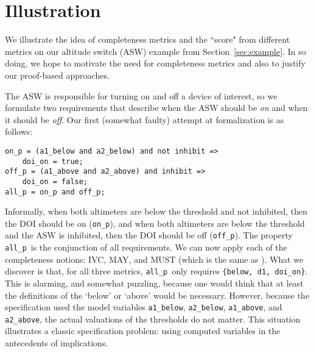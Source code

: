 \section{Illustration}
\label{sec:illust}

\newcommand{\allp}{\texttt{all\_p}}
\newcommand{\onp}{\texttt{on\_p}}
\newcommand{\offp}{\texttt{off\_p}}
\newcommand{\hystp}{\texttt{hyst\_p}}
\newcommand{\aonebelow}{\texttt{a1\_below}}
\newcommand{\atwobelow}{\texttt{a2\_below}}
\newcommand{\aoneabove}{\texttt{a1\_above}}
\newcommand{\atwoabove}{\texttt{a2\_above}}
\newcommand{\doion}{\texttt{doi\_on}}
\newcommand{\done}{\texttt{d1}}
\newcommand{\dtwo}{\texttt{d2}}
\newcommand{\abovehyst}{\texttt{above\_hyst}}
\newcommand{\inhibit}{\texttt{inhibit}}

We illustrate the idea of completeness metrics and the ``score" from different metrics on our altitude switch (ASW) example from Section~\ref{sec:example}.  In so doing, we hope to motivate the need for completeness metrics and also to justify our proof-based approaches.

The ASW is responsible for turning on and off a device of interest, so we formulate two requirements that describe when the ASW should be {\em on} and when it should be {\em off}.  Our first (somewhat faulty) attempt at formalization is as follows:

{\smaller
\begin{verbatim}
on_p = (a1_below and a2_below) and not inhibit =>
    doi_on = true;
off_p = (a1_above and a2_above) and inhibit =>
    doi_on = false;
all_p = on_p and off_p;
\end{verbatim}
}

\noindent Informally, when both altimeters are below the threshold and not inhibited, then the DOI should be on (\onp), and when both altimeters are below the threshold and the ASW is inhibited, then the DOI should be off (\offp).  The property \allp\ is the conjunction of all requirements.  We can now apply each of the completeness notions: IVC, MAY, and MUST (which is the same as \nondetcov).  What we discover is that, for all three metrics, \allp\ only requires \texttt{\{below, d1, doi\_on\}}.  This is alarming, and somewhat puzzling, because one would think that at least the definitions of the `below' or `above' would be necessary.  However, because the specification used the model variables \aonebelow, \atwobelow, \aoneabove, and \atwoabove, the actual valuations of the thresholds do not matter.  This situation illustrates a classic specification problem: using computed variables in the antecedents of implications.

